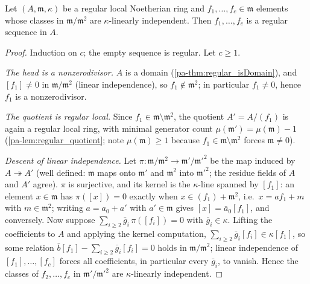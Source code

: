 \begin{theorem}
  \label{pa-thm:matsumura_regular_sequence}
  \leanok

  Let \((A, \mathfrak m, \kappa)\) be a regular local Noetherian ring and
  \(f_1, \dots, f_c \in \mathfrak m\) elements whose classes in
  \(\mathfrak m/\mathfrak m^2\) are \(\kappa\)-linearly independent. Then
  \(f_1, \dots, f_c\) is a regular sequence in \(A\).
\end{theorem}
\begin{proof}
  \leanok
  Induction on \(c\); the empty sequence is regular. Let \(c \geq 1\).

  \emph{The head is a nonzerodivisor.} \(A\) is a domain
  (\ref{pa-thm:regular_isDomain}), and \([f_1] \neq 0\) in
  \(\mathfrak m/\mathfrak m^2\) (linear independence), so
  \(f_1 \notin \mathfrak m^2\); in particular \(f_1 \neq 0\), hence \(f_1\) is
  a nonzerodivisor.

  \emph{The quotient is regular local.} Since
  \(f_1 \in \mathfrak m \setminus \mathfrak m^2\), the quotient
  \(A' = A/(f_1)\) is again a regular local ring, with minimal generator count
  \(\mu(\mathfrak m') = \mu(\mathfrak m) - 1\) (\ref{pa-lem:regular_quotient};
  note \(\mu(\mathfrak m) \geq 1\) because \(f_1 \in \mathfrak m \setminus
  \mathfrak m^2\) forces \(\mathfrak m \neq 0\)).

  \emph{Descent of linear independence.} Let \(\pi : \mathfrak m/\mathfrak m^2
  \to \mathfrak m'/\mathfrak m'^2\) be the map induced by \(A \twoheadrightarrow
  A'\) (well defined: \(\mathfrak m\) maps onto \(\mathfrak m'\) and
  \(\mathfrak m^2\) into \(\mathfrak m'^2\); the residue fields of \(A\) and
  \(A'\) agree). \(\pi\) is surjective, and its kernel is the \(\kappa\)-line
  spanned by \([f_1]\): an element \(x \in \mathfrak m\) has
  \(\pi([x]) = 0\) exactly when \(x \in (f_1) + \mathfrak m^2\), i.e.\
  \(x = a f_1 + m\) with \(m \in \mathfrak m^2\); writing \(a = a_0 + a'\) with
  \(a' \in \mathfrak m\) gives \([x] = \bar a_0 [f_1]\), and conversely.
  Now suppose \(\sum_{i \geq 2} \bar g_i\, \pi([f_i]) = 0\) with
  \(\bar g_i \in \kappa\). Lifting the coefficients to \(A\) and applying the
  kernel computation, \(\sum_{i \geq 2} \bar g_i [f_i] \in \kappa [f_1]\), so
  some relation \(\bar b [f_1] - \sum_{i \geq 2} \bar g_i [f_i] = 0\) holds in
  \(\mathfrak m / \mathfrak m^2\); linear independence of
  \([f_1], \dots, [f_c]\) forces all coefficients, in particular every
  \(\bar g_i\), to vanish. Hence the classes of \(f_2, \dots, f_c\) in
  \(\mathfrak m'/\mathfrak m'^2\) are \(\kappa\)-linearly independent.


\end{proof}
